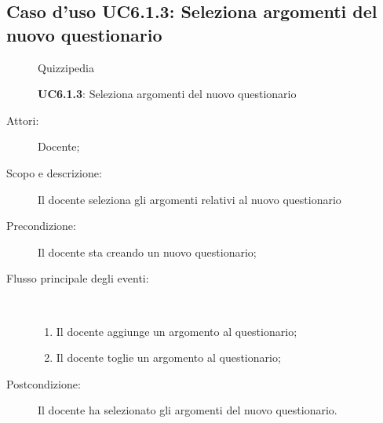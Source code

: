 \subsection{Caso d'uso UC6.1.3: Seleziona argomenti del nuovo questionario}
	\begin{figure}[H]
		\centering
		\begin{resizedtikzpicture}{\textwidth}
		\begin{umlsystem}[x=0, fill=lightgray!20]{Quizzipedia}
		\end{umlsystem}
		\end{resizedtikzpicture}
		\caption{\textbf{UC6.1.3}: Seleziona argomenti del nuovo questionario}
		\label{UC6.1.3}
	\end{figure}
\begin{description}
\item[Attori:] Docente;
\item[Scopo e descrizione:] Il docente seleziona gli argomenti relativi al nuovo questionario 
      \item[Precondizione:] Il docente sta creando un nuovo questionario;

        \item[Flusso principale degli eventi:] \ 
 \begin{enumerate}
          \item Il docente aggiunge un argomento al questionario;
          \item Il docente toglie un argomento al questionario;

      \end{enumerate}
    \item[Postcondizione:] Il docente ha selezionato gli argomenti del nuovo questionario.
  \end{description}
\hypertarget{UC6.2}{}
